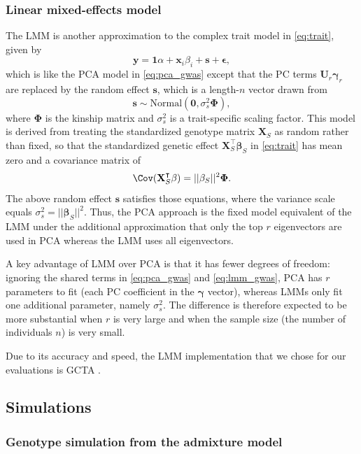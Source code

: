 \documentclass[11pt]{article}
\begin{document}
\subsubsection{Linear mixed-effects model}

The LMM is another approximation to the complex trait model in \cref{eq:trait}, given by
\begin{equation}
  \label{eq:lmm_gwas}
  \mathbf{y}
  =
  \mathbf{1} \alpha + \mathbf{x}_i \beta_i + \mathbf{s} + \mathbf{\epsilon}
  ,
\end{equation}
which is like the PCA model in \cref{eq:pca_gwas} except that the PC terms $\mathbf{U}_r \mathbf{\gamma}_r$ are replaced by the random effect $\mathbf{s}$, which is a length-$n$ vector drawn from
$$
\mathbf{s} \sim \text{Normal} \left( \mathbf{0}, \sigma^2_s \mathbf{\Phi} \right),
$$
where $\mathbf{\Phi}$ is the kinship matrix and $\sigma^2_s$ is a trait-specific scaling factor.
This model is derived from treating the standardized genotype matrix $\mathbf{X}_S$ as random rather than fixed, so that the standardized genetic effect
$\mathbf{X}_S^\intercal \mathbf{\beta}_S$
in \cref{eq:trait} has mean zero and a covariance matrix of
$$
\Cov ( \mathbf{X}_S^\intercal \mathbf{\beta} )
=
|| \mathbf{\beta}_S ||^2 \mathbf{\Phi}
.
$$
The above random effect $\mathbf{s}$ satisfies those equations, where the variance scale equals $\sigma^2_s = || \mathbf{\beta}_S ||^2$.
Thus, the PCA approach is the fixed model equivalent of the LMM under the additional approximation that only the top $r$ eigenvectors are used in PCA whereas the LMM uses all eigenvectors.

A key advantage of LMM over PCA is that it has fewer degrees of freedom: ignoring the shared terms in \cref{eq:pca_gwas} and \cref{eq:lmm_gwas}, PCA has $r$ parameters to fit (each PC coefficient in the $\mathbf{\gamma}$ vector), whereas LMMs only fit one additional parameter, namely $\sigma^2_s$.
The difference is therefore expected to be more substantial when $r$ is very large and when the sample size (the number of individuals $n$) is very small.

Due to its accuracy and speed, the LMM implementation that we chose for our evaluations is GCTA \citep{yang_gcta:_2011}.

\subsection{Simulations}

\subsubsection{Genotype simulation from the admixture model}
\end{document}
